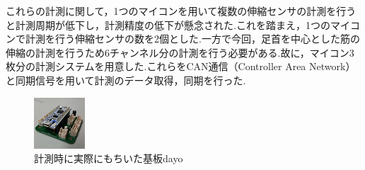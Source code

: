 これらの計測に関して，1つのマイコンを用いて複数の伸縮センサの計測を行うと計測周期が低下し，計測精度の低下が懸念された.これを踏まえ，1つのマイコンで計測を行う伸縮センサの数を2個とした.一方で今回，足首を中心とした筋の伸縮の計測を行うため6チャンネル分の計測を行う必要がある.故に，マイコン3枚分の計測システムを用意した.これらをCAN通信（Controller Area Network）と同期信号を用いて計測のデータ取得，同期を行った.
\begin{figure}[h]
 \begin{center}
  \includegraphics[width=0.5\columnwidth,clip,bb=0 0 52 52]{Photo/2.実験方法/circuit.png}
  \caption{計測時に実際にもちいた基板dayo}
  \label{circuit}
 \end{center}
\end{figure}